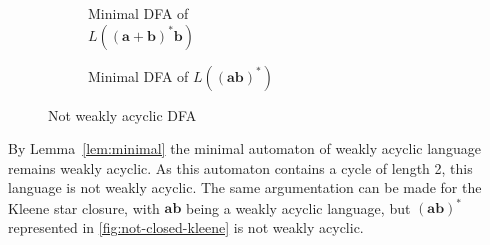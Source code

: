 \begin{figure}[t]
\centering 
	\begin{subfigure}{.30\textwidth}	
		\centering 
    	\centering 
    	\caption{Minimal DFA of \\ $L(\bm{(a + b)^{*}b})$}\label{fig:not-closed-concat}
    \end{subfigure}
    \begin{subfigure}{.60\textwidth}
	\centering 
    	\caption{Minimal DFA of $L(\bm{(ab)^{*}})$}\label{fig:not-closed-kleene}
    \end{subfigure}
     \caption{Not weakly acyclic DFA}
\end{figure}

By Lemma~\autoref{lem:minimal} the minimal automaton of weakly acyclic language remains weakly acyclic. As this automaton contains a cycle of length 2, this language is not weakly acyclic. The same argumentation can be made for the Kleene star closure, with $\bm{ab}$ being a weakly acyclic language, but $\bm{(ab)^{*}}$ represented in \autoref{fig:not-closed-kleene} is not weakly acyclic. 

